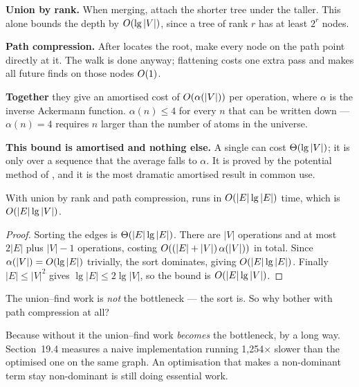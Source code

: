 \begin{conceptbox}
\textbf{Union by rank.} When merging, attach the shorter tree under the taller.
This alone bounds the depth by $O(\operatorname{lg} |V|)$, since a tree of rank $r$ has
at least $2^{r}$ nodes.

\smallskip
\textbf{Path compression.} After  locates the root, make every
node on the path point directly at it. The walk is done anyway; flattening
costs one extra pass and makes all future finds on those nodes $O(1)$.

\smallskip
\textbf{Together} they give an amortised cost of $O(\alpha(|V|))$ per
operation, where $\alpha$ is the inverse Ackermann function. $\alpha(n) \le 4$
for every $n$ that can be written down --- $\alpha(n) = 4$ requires $n$ larger
than the number of atoms in the universe.

\smallskip
\textbf{This bound is amortised and nothing else.} A single  can
cost $\Theta(\operatorname{lg} |V|)$; it is only over a sequence that the average falls to
$\alpha$. It is proved by the potential method of , and it is
the most dramatic amortised result in common use.
\end{conceptbox}

\begin{theorem}\label{thm:kruskaltime}
With union by rank and path compression,  runs in
$O(|E| \operatorname{lg} |E|)$ time, which is $O(|E| \operatorname{lg} |V|)$.
\end{theorem}

\begin{proof}
Sorting the edges is $\Theta(|E|\operatorname{lg}|E|)$. There are $|V|$ 
operations and at most $2|E|$  plus $|V|-1$ 
operations, costing $O((|E|+|V|)\,\alpha(|V|))$ in total. Since
$\alpha(|V|) = O(\operatorname{lg} |E|)$ trivially, the sort dominates, giving
$O(|E|\operatorname{lg}|E|)$. Finally $|E| \le |V|^{2}$ gives $\lg|E| \le 2\lg|V|$, so
the bound is $O(|E|\operatorname{lg}|V|)$.
\end{proof}

\begin{alertbox}
The union--find work is \emph{not} the bottleneck --- the sort is. So why
bother with path compression at all?

\smallskip
Because without it the union--find work \emph{becomes} the bottleneck, by a
long way. Section~19.4 measures a naive implementation running 1{,}254$\times$
slower than the optimised one on the same graph. An optimisation that makes a
non-dominant term stay non-dominant is still doing essential work.
\end{alertbox}

